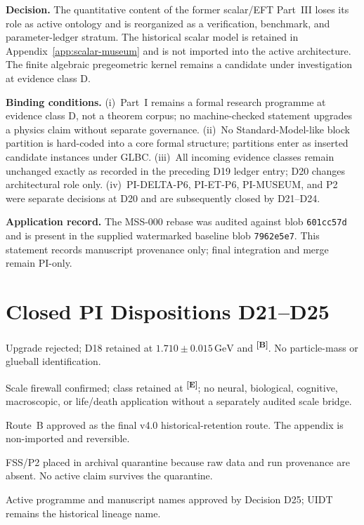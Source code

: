 \documentclass[12pt,a4paper,twoside]{article}
\theoremstyle{plain}
\theoremstyle{definition}
\theoremstyle{remark}
\newcommand{\catmark}[1]{\textsuperscript{\textsf{\textbf{[#1]}}}}
\begin{document}
\begin{pioverridebox}
\textbf{Decision.} The quantitative content of the former scalar/EFT Part~III
loses its role as active ontology and is reorganized as a verification,
benchmark, and parameter-ledger stratum. The historical scalar model is
retained in Appendix~\ref{app:scalar-museum} and is not imported into the
active architecture. The finite algebraic pregeometric kernel remains a
candidate under investigation at evidence class D.

\textbf{Binding conditions.}
(i)~Part~I remains a formal research programme at evidence class D, not a
theorem corpus; no machine-checked statement upgrades a physics claim without
separate governance.
(ii)~No Standard-Model-like block partition is hard-coded into a core formal
structure; partitions enter as inserted candidate instances under GLBC.
(iii)~All incoming evidence classes remain unchanged exactly as recorded in
the preceding D19 ledger entry; D20 changes architectural role only.
(iv)~PI-DELTA-P6, PI-ET-P6, PI-MUSEUM, and P2 were separate decisions at D20 and are subsequently closed by D21--D24.

\textbf{Application record.} The MSS-000 rebase was audited against blob
\texttt{601cc57d} and is present in the supplied watermarked baseline blob
\texttt{7962e5e7}. This statement records manuscript provenance only; final
integration and merge remain PI-only.
\end{pioverridebox}

\section{Closed PI Dispositions D21--D25}
\label{sec:closed-pi-dispositions}

\begin{description}[leftmargin=2.8cm,style=nextline]
\item[D21 --- $\Delta$.] Upgrade rejected; D18 retained at
$1.710\pm0.015\,\mathrm{GeV}$ and \catmark{B}. No particle-mass or glueball
identification.
\item[D22 --- $E_T$.] Scale firewall confirmed; class retained at
\catmark{E}; no neural, biological, cognitive, macroscopic, or life/death
application without a separately audited scale bridge.
\item[D23 --- Museum.] Route~B approved as the final v4.0 historical-retention
route. The appendix is non-imported and reversible.
\item[D24 --- P2.] FSS/P2 placed in archival quarantine because raw data and
run provenance are absent. No active claim survives the quarantine.
\item[D25 --- Name.] Active programme and manuscript names approved by Decision D25; UIDT remains the historical lineage name.
\end{description}
\end{document}
